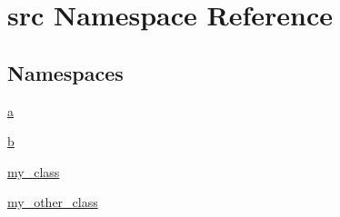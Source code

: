 \hypertarget{namespacesrc}{}\section{src Namespace Reference}
\label{namespacesrc}
\subsection*{Namespaces}
\begin{DoxyCompactItemize}
\item 
 \hyperlink{namespacesrc_1_1a}{a}
\item 
 \hyperlink{namespacesrc_1_1b}{b}
\item 
 \hyperlink{namespacesrc_1_1my__class}{my\+\_\+class}
\item 
 \hyperlink{namespacesrc_1_1my__other__class}{my\+\_\+other\+\_\+class}
\end{DoxyCompactItemize}

